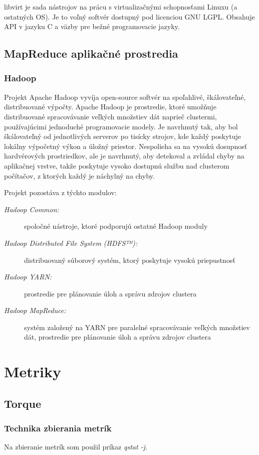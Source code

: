 \documentclass[11pt,final,oneside]{fithesis}
\begin{document}
libvirt je sada nástrojov na prácu s virtualizačnými schopnosťami Linuxu (a ostatných OS). Je to voľný softvér dostupný pod licenciou GNU LGPL. 
Obsahuje API v jazyku C a väzby pre bežné programovacie jazyky.\cite{libvirt}


\section{MapReduce aplikačné prostredia}
\subsection{Hadoop}
Projekt Apache Hadoop vyvíja open-source softvér na spoľahlivé, škálovateľné, distribuované výpočty. Apache Hadoop je prostredie, ktoré umožňuje distribuované spracovávanie veľkých množstiev dát
naprieč clustermi, používajúcimi jednoduché programovacie modely. Je navrhnutý tak, aby bol škálovateľný od jednotlivých serverov po tisícky strojov, kde každý poskytuje lokálny výpočetný výkon a úložný priestor.
Nespolieha sa na vysokú dosupnosť hardvérových prostriedkov, ale je navrhnutý, aby detekoval a zvládal chyby na aplikačnej vrstve, takže poskytuje vysoko dostupnú službu nad clusterom počítačov, z ktorých 
každý je náchylný na chyby.

Projekt pozostáva z týchto modulov:

\begin{description}
\item[\emph{Hadoop Common:}] spoločné nástroje, ktoré podporujú ostatné Hadoop moduly
\item[\emph{Hadoop Distributed File System (HDFS™):}] distribuovaný súborový systém, ktorý poskytuje vysokú priepustnosť
\item[\emph{Hadoop YARN:}] prostredie pre plánovanie úloh a správu zdrojov clustera
\item[\emph{Hadoop MapReduce:}] systém založený na YARN pre paralelné spracovávanie veľkých množstiev dát, prostredie pre plánovanie úloh a správu zdrojov clustera
\end{description}

\chapter{Metriky}
\section{Torque}
\subsection{Technika zbierania metrík}
Na zbieranie metrík som použil príkaz \emph{qstat -j}.
\end{document}
